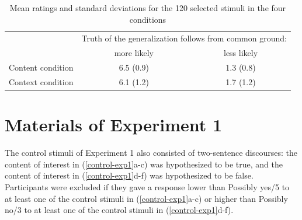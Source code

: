 \documentclass[11pt,fleqn]{article}
\newcommand{\6}{\mbox{$[\hspace*{-.6mm}[$}}
\newcommand{\9}{\mbox{$]\hspace*{-.6mm}]$}}
\begin{document}
\begin{table}[!h]
\centering

\begin{tabular}{l|cc}
& \multicolumn{2}{c}{Truth of the generalization follows from common ground:} \\
& more likely & less likely \\\hline

Content condition &  6.5 (0.9) &  1.3 (0.8) \\
Context condition &  6.1 (1.2) &  1.7 (1.2) \\

\hline
\end{tabular}

\caption{Mean ratings and standard deviations for the 120 selected stimuli in the four conditions}\label{t-mean-final}

\end{table}

%
%
%


\section{Materials of Experiment 1}\label{a-Exp1}

The control stimuli of Experiment 1 also consisted of two-sentence discourses: the content of interest in (\ref{control-exp1}a-c) was hypothesized to be true, and the content of interest in (\ref{control-exp1}d-f) was hypothesized to be false. Participants were excluded if they gave a response lower than Possibly yes/5 to at least one of the control stimuli in (\ref{control-exp1}a-c) or higher than Possibly no/3 to at least one of the control stimuli in (\ref{control-exp1}d-f). 
\end{document}
